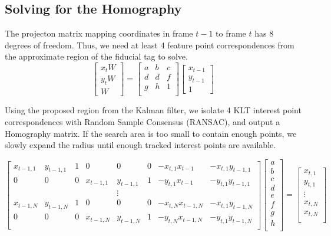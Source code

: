 \documentclass[12pt]{article}
\begin{document}
\subsection{Solving for the Homography}
The projecton matrix mapping coordinates in frame $t-1$ to frame $t$ has 8 degrees of freedom. Thus, we need at least 4 feature point correspondences from the approximate region of the fiducial tag to solve. 
\begin{equation}
\begin{bmatrix}
x_{t}W\\
y_{t}W\\
W
\end{bmatrix}
= \begin{bmatrix}
a&b&c\\
d&d&f\\
g&h&1\\
\end{bmatrix}
\begin{bmatrix}
x_{t-1}\\
y_{t-1}\\
1
\end{bmatrix}
\end{equation}

Using the proposed region from the Kalman filter, we isolate 4 KLT interest point correspondences  with Random Sample Consensus (RANSAC), and output a Homography matrix. If the search area is too small to contain enough points, we slowly expand the radius until enough tracked interest points are available.

\begin{equation}
\begin{bmatrix}
x_{t-1,1}& y_{t-1,1}&1&0&0&0 &-x_{t,1}x_{t-1}& -x_{t,1}y_{t-1,1}\\
0&0&0&x_{t-1,1}& y_{t-1,1}&1& -y_{t,1}x_{t-1} &-y_{t,1}y_{t-1,1}\\
&&&&\vdots&&\\
x_{t-1,N}& y_{t-1,N}&1&0&0&0& -x_{t,N}x_{t-1,N}& -x_{t,1}y_{t-1,N}\\
0&0&0&x_{t-1,N}& y_{t-1,N}&1& -y_{t,N}x_{t-1,N}& -y_{t,1}y_{t-1,N}\\
\end{bmatrix}
\begin{bmatrix}
a\\
b\\
c\\
d\\
e\\
f\\
g\\
h\\
\end{bmatrix} = 
\begin{bmatrix}
x_{t,1}\\
y_{t,1}\\
\vdots\\
x_{t,N}\\
x_{t,N}\\
\end{bmatrix}
\end{equation}
\end{document}
